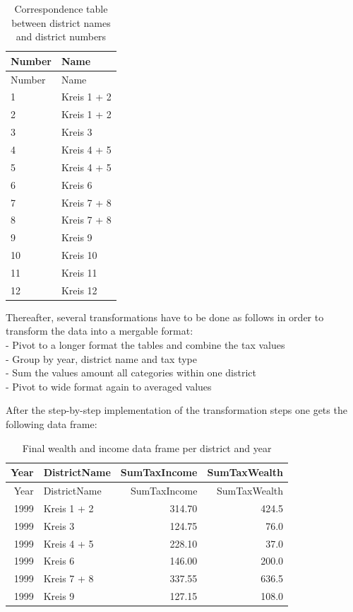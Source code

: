 \documentclass[
]{article}
\begin{document}
\begin{longtable}[]{@{}ll@{}}
\caption{Correspondence table between district names and district
numbers}\tabularnewline
\toprule
Number & Name \\
\midrule
\endfirsthead
\toprule
Number & Name \\
\midrule
\endhead
1 & Kreis 1 + 2 \\
2 & Kreis 1 + 2 \\
3 & Kreis 3 \\
4 & Kreis 4 + 5 \\
5 & Kreis 4 + 5 \\
6 & Kreis 6 \\
7 & Kreis 7 + 8 \\
8 & Kreis 7 + 8 \\
9 & Kreis 9 \\
10 & Kreis 10 \\
11 & Kreis 11 \\
12 & Kreis 12 \\
\bottomrule
\end{longtable}

Thereafter, several transformations have to be done as follows in order
to transform the data into a mergable format:\\
- Pivot to a longer format the tables and combine the tax values\\
- Group by year, district name and tax type\\
- Sum the values amount all categories within one district\\
- Pivot to wide format again to averaged values

After the step-by-step implementation of the transformation steps one
gets the following data frame:

\begin{longtable}[]{@{}rlrr@{}}
\caption{Final wealth and income data frame per district and
year}\tabularnewline
\toprule
Year & DistrictName & SumTaxIncome & SumTaxWealth \\
\midrule
\endfirsthead
\toprule
Year & DistrictName & SumTaxIncome & SumTaxWealth \\
\midrule
\endhead
1999 & Kreis 1 + 2 & 314.70 & 424.5 \\
1999 & Kreis 3 & 124.75 & 76.0 \\
1999 & Kreis 4 + 5 & 228.10 & 37.0 \\
1999 & Kreis 6 & 146.00 & 200.0 \\
1999 & Kreis 7 + 8 & 337.55 & 636.5 \\
1999 & Kreis 9 & 127.15 & 108.0 \\
\bottomrule
\end{longtable}
\end{document}

